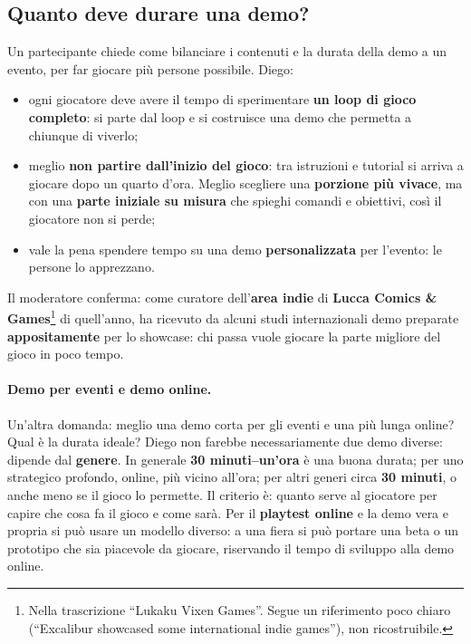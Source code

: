 \subsection{Quanto deve durare una demo?}

Un partecipante chiede come bilanciare i contenuti e la durata della demo a un
evento, per far giocare più persone possibile. Diego:
\begin{itemize}
  \item ogni giocatore deve avere il tempo di sperimentare \textbf{un loop di gioco
        completo}: si parte dal loop e si costruisce una demo che permetta a
        chiunque di viverlo;
  \item meglio \textbf{non partire dall'inizio del gioco}: tra istruzioni e
        tutorial si arriva a giocare dopo un quarto d'ora. Meglio scegliere una
        \textbf{porzione più vivace}, ma con una \textbf{parte iniziale su misura}
        che spieghi comandi e obiettivi, così il giocatore non si perde;
  \item vale la pena spendere tempo su una demo \textbf{personalizzata} per
        l'evento: le persone lo apprezzano.
\end{itemize}

Il moderatore conferma: come curatore dell'\textbf{area indie} di \textbf{Lucca
Comics \& Games}\footnote{Nella trascrizione ``Lukaku Vixen Games''. Segue un
riferimento poco chiaro (``Excalibur showcased some international indie games''),
non ricostruibile.} di quell'anno, ha ricevuto da alcuni studi internazionali demo
preparate \textbf{appositamente} per lo showcase: chi passa vuole giocare la parte
migliore del gioco in poco tempo.

\paragraph{Demo per eventi e demo online.} Un'altra domanda: meglio una demo corta
per gli eventi e una più lunga online? Qual è la durata ideale? Diego non farebbe
necessariamente due demo diverse: dipende dal \textbf{genere}. In generale
\textbf{30 minuti--un'ora} è una buona durata; per uno strategico profondo, online,
più vicino all'ora; per altri generi circa \textbf{30 minuti}, o anche meno se il
gioco lo permette. Il criterio è: quanto serve al giocatore per capire che cosa fa il
gioco e come sarà. Per il \textbf{playtest online} e la demo vera e propria si può
usare un modello diverso: a una fiera si può portare una beta o un prototipo che sia
piacevole da giocare, riservando il tempo di sviluppo alla demo online.

